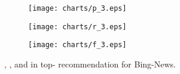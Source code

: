 \documentclass[sigconf]{acmart}
\begin{document}
        \begin{figure*}[t]
			\centering
            \begin{subfigure}[b]{0.3\textwidth}
                \texttt{[image: charts/p\_3.eps]}
                \caption{}
            \end{subfigure}
            \hfill
            \begin{subfigure}[b]{0.3\textwidth}
                \texttt{[image: charts/r\_3.eps]}
                \caption{}
            \end{subfigure}
            \hfill
            \begin{subfigure}[b]{0.3\textwidth}
                \texttt{[image: charts/f\_3.eps]}
                \caption{}
            \end{subfigure}
            \caption{, , and  in top- recommendation for Bing-News.}
            \label{fig:topk_news}
        \end{figure*}
        
\end{document}
